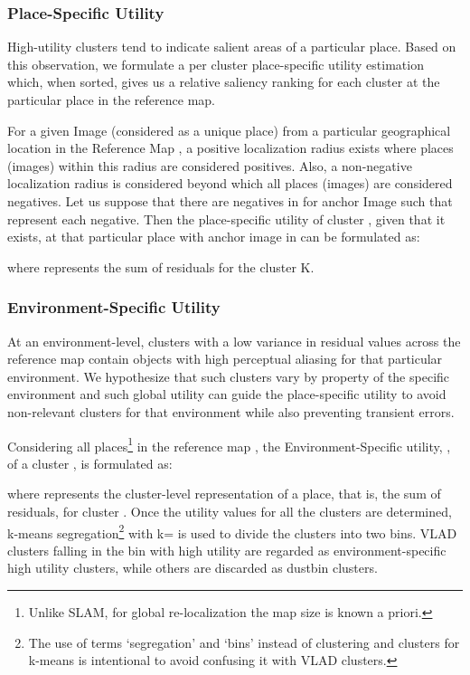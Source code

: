 \documentclass[letterpaper, 10 pt, conference]{ieeeconf}  \fi
\begin{document}
\subsubsection{Place-Specific Utility}
\label{sec:PS}
High-utility clusters tend to indicate salient areas of a particular place. Based on this observation, we formulate a per cluster place-specific utility estimation which, when sorted, gives us a relative saliency ranking for each cluster at the particular place in the reference map.

For a given Image  (considered as a unique place) from a particular geographical location in the Reference Map , a positive localization radius  exists where places (images) within this radius are considered positives. Also, a non-negative localization radius  is considered beyond which all places (images) are considered negatives. Let us suppose that there are  negatives in  for anchor Image  such that  represent each negative. Then the place-specific utility of cluster , given that it exists, at that particular place with anchor image  in  can be formulated as:


where  represents the sum of residuals for the cluster K.

\subsubsection{Environment-Specific Utility}
\label{sec:ES}

At an environment-level, clusters with a low variance in residual values across the reference map contain objects with high perceptual aliasing for that particular environment. We hypothesize that such clusters vary by property of the specific environment and such global utility can guide the place-specific utility to avoid non-relevant clusters for that environment while also preventing transient errors.

Considering all  places\footnote{Unlike SLAM, for global re-localization the map size is known a priori.} in the reference map , the Environment-Specific utility, , of a cluster , is formulated as:


where  represents the cluster-level representation of a place, that is, the sum of residuals, for cluster . Once the utility values for all the  clusters are determined, k-means segregation\footnote{The use of terms `segregation' and `bins' instead of clustering and clusters for k-means is intentional to avoid confusing it with VLAD clusters.} with k= is used to divide the clusters into two bins. VLAD clusters falling in the bin with high utility are regarded as environment-specific high utility clusters, while others are discarded as dustbin clusters.
\end{document}
